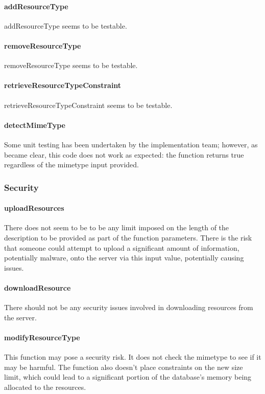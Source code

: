 \documentclass[a4paper]{article}
\begin{document}
\paragraph{addResourceType}
addResourceType seems to be testable.

\paragraph{removeResourceType}
removeResourceType seems to be testable.

\paragraph{retrieveResourceTypeConstraint}
retrieveResourceTypeConstraint seems to be testable.

\paragraph{detectMimeType}
Some unit testing has been undertaken by the implementation team; however, as became clear, this code does not work as expected: the function returns true regardless of the mimetype input provided. 

\subsubsection {Security}

\paragraph{uploadResources}
There does not seem to be to be any limit imposed on the length of the description to be provided as part of the function parameters. There is the risk that someone could attempt to upload a significant amount of information, potentially malware, onto the server via this input value, potentially causing issues. 

\paragraph{downloadResource}
There should not be any security issues involved in downloading resources from the server.

\paragraph{modifyResourceType}
This function may pose a security risk. It does not check the mimetype to see if it may be harmful. The function also doesn’t place constraints on the new size limit, which could lead to a significant portion of the database’s memory being allocated to the resources.
\end{document}
